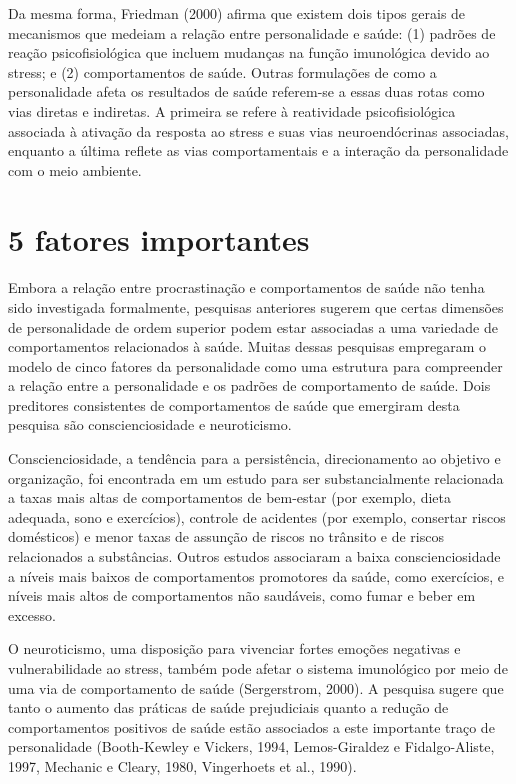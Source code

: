 \documentclass{report}
\begin{document}
Da mesma forma, Friedman (2000) afirma que existem dois tipos gerais de mecanismos que medeiam a relação entre personalidade e saúde: (1) padrões de reação psicofisiológica que incluem mudanças na função imunológica devido ao stress; e (2) comportamentos de saúde. Outras formulações de como a personalidade afeta os resultados de saúde referem-se a essas duas rotas como vias diretas e indiretas. A primeira se refere à reatividade psicofisiológica associada à ativação da resposta ao stress e suas vias neuroendócrinas associadas, enquanto a última reflete as vias comportamentais e a interação da personalidade com o meio ambiente.

\section{5 fatores importantes}
\label{chap.fatores}
\paragraph{}
Embora a relação entre procrastinação e comportamentos de saúde não tenha sido investigada formalmente, pesquisas anteriores sugerem que certas dimensões de personalidade de ordem superior podem estar associadas a uma variedade de comportamentos relacionados à saúde. Muitas dessas pesquisas empregaram o modelo de cinco fatores da personalidade como uma estrutura para compreender a relação entre a personalidade e os padrões de comportamento de saúde. Dois preditores consistentes de comportamentos de saúde que emergiram desta pesquisa são conscienciosidade e neuroticismo.

Conscienciosidade, a tendência para a persistência, direcionamento ao objetivo e organização, foi encontrada em um estudo para ser substancialmente relacionada a taxas mais altas de comportamentos de bem-estar (por exemplo, dieta adequada, sono e exercícios), controle de acidentes (por exemplo, consertar riscos domésticos) e menor taxas de assunção de riscos no trânsito e de riscos relacionados a substâncias. Outros estudos associaram a baixa conscienciosidade a níveis mais baixos de comportamentos promotores da saúde, como exercícios, e níveis mais altos de comportamentos não saudáveis, como fumar e beber em excesso.

O neuroticismo, uma disposição para vivenciar fortes emoções negativas e vulnerabilidade ao stress, também pode afetar o sistema imunológico por meio de uma via de comportamento de saúde (Sergerstrom, 2000). A pesquisa sugere que tanto o aumento das práticas de saúde prejudiciais quanto a redução de comportamentos positivos de saúde estão associados a este importante traço de personalidade (Booth-Kewley e Vickers, 1994, Lemos-Giraldez e Fidalgo-Aliste, 1997, Mechanic e Cleary, 1980, Vingerhoets et al., 1990).
\end{document}
